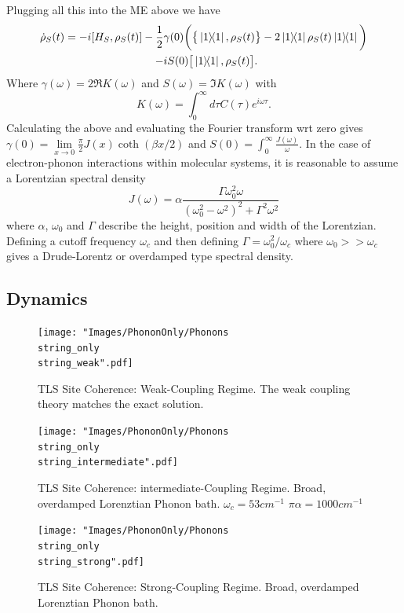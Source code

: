 \documentclass[]{article}
\begin{document}
\begin{itemize}
\begin{itemize}
Plugging all this into the ME above we have
\begin{align}
\dot{\rho}_S(t) = -i[H_S, \rho_S(t)] -\frac{1}{2}&\gamma(0)\bigg(\big\{\dyad{1},\rho_S(t)\big\} - 2\dyad{1}\rho_S(t)\dyad{1}\bigg)\\-&iS(0)\big[\dyad{1},\rho_S(t)\big].
\end{align}
Where $\gamma(\omega)=2\Re{K(\omega)}$ and $S(\omega)=\Im{K(\omega)}$ with
\begin{equation}
K(\omega) = \int_{0}^{\infty}d\tau C(\tau)e^{i\omega\tau}.
\end{equation}
Calculating the above and evaluating the Fourier transform wrt zero gives $\gamma(0)=\lim\limits_{x\to0}\frac{\pi}{2}J(x)\coth(\beta x/2)$ and $S(0)=\int_{0}^{\infty}\frac{J(\omega)}{\omega}$.
In the case of electron-phonon interactions within molecular systems, it is reasonable to assume a Lorentzian spectral density
\begin{equation}
J(\omega) = \alpha \frac{\Gamma \omega_0^2 \omega}{(\omega_0^2 - \omega^2)^2 + \Gamma^2\omega^2}
\end{equation}
where $\alpha$, $\omega_0$ and $\Gamma$ describe the height, position and width of the Lorentzian. Defining a cutoff frequency $\omega_c$ and then defining $\Gamma = \omega_0^2/\omega_c$ where $\omega_0>>\omega_c$ gives a Drude-Lorentz or overdamped type spectral density.

\subsection{Dynamics}
\begin{figure}[t]
	\centering
	\begin{minipage}[b]{0.325\textwidth}
		\texttt{[image: "Images/PhononOnly/Phonons\\string\_only\\string\_weak".pdf]}
		\caption{TLS Site Coherence: Weak-Coupling Regime. The weak coupling theory matches the exact solution.}
		\label{fig:PhononOnlyWeak}
	\end{minipage}
	\begin{minipage}[b]{0.325\textwidth}
		\texttt{[image: "Images/PhononOnly/Phonons\\string\_only\\string\_intermediate".pdf]}
		\caption{TLS Site Coherence: intermediate-Coupling Regime. Broad, overdamped Lorenztian Phonon bath. $\omega_{c}=53cm^{-1}$ $\pi\alpha=1000cm^{-1}$}
		\label{fig:PhononOnlyIntermediate}
	\end{minipage}
	\begin{minipage}[b]{0.325\textwidth}
		\texttt{[image: "Images/PhononOnly/Phonons\\string\_only\\string\_strong".pdf]}
		\caption{TLS Site Coherence: Strong-Coupling Regime. Broad, overdamped Lorenztian Phonon bath.}
		\label{fig:PhononOnlyStrong}
	\end{minipage}
\end{figure}


\end{itemize}
\end{itemize}
\end{document}
